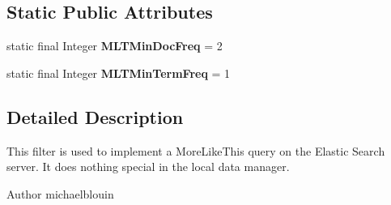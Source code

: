 \subsection*{Static Public Attributes}
\begin{DoxyCompactItemize}
\item 
\hypertarget{classcom_1_1ualberta_1_1team17_1_1datamanager_1_1_more_like_this_filter_a4e998d5a6e957e4b175b95ea65965194}{static final Integer {\bfseries M\+L\+T\+Min\+Doc\+Freq} = 2}\label{classcom_1_1ualberta_1_1team17_1_1datamanager_1_1_more_like_this_filter_a4e998d5a6e957e4b175b95ea65965194}

\item 
\hypertarget{classcom_1_1ualberta_1_1team17_1_1datamanager_1_1_more_like_this_filter_a6d7b98cc33ba306bd91805d536d7e03c}{static final Integer {\bfseries M\+L\+T\+Min\+Term\+Freq} = 1}\label{classcom_1_1ualberta_1_1team17_1_1datamanager_1_1_more_like_this_filter_a6d7b98cc33ba306bd91805d536d7e03c}

\end{DoxyCompactItemize}


\subsection{Detailed Description}
This filter is used to implement a More\+Like\+This query on the Elastic Search server. It does nothing special in the local data manager.

\begin{DoxyAuthor}{Author}
michaelblouin 
\end{DoxyAuthor}


